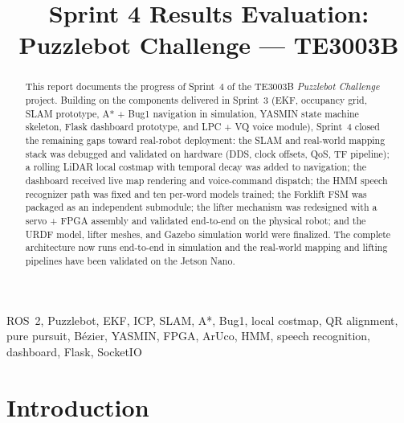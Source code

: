 \documentclass[conference]{IEEEtran}
\begin{document}
\title{Sprint 4 Results Evaluation:\\
Puzzlebot Challenge --- TE3003B}

\author{
}
\maketitle

\begin{abstract}
This report documents the progress of Sprint~4 of the TE3003B
\textit{Puzzlebot Challenge} project. Building on the components delivered
in Sprint~3 (EKF, occupancy grid, SLAM prototype, A* + Bug1 navigation in
simulation, YASMIN state machine skeleton, Flask dashboard prototype, and
LPC + VQ voice module), Sprint~4 closed the remaining gaps toward real-robot
deployment: the SLAM and real-world mapping stack was debugged and validated
on hardware (DDS, clock offsets, QoS, TF pipeline); a rolling LiDAR local
costmap with temporal decay was added to navigation; the dashboard received
live map rendering and voice-command dispatch; the HMM speech recognizer path
was fixed and ten per-word models trained; the Forklift FSM was packaged as
an independent submodule; the lifter mechanism was redesigned with a
servo + FPGA assembly and validated end-to-end on the physical robot; and the
URDF model, lifter meshes, and Gazebo simulation world were finalized.
The complete architecture now runs end-to-end in simulation and the
real-world mapping and lifting pipelines have been validated on the Jetson Nano.
\end{abstract}

\begin{IEEEkeywords}
ROS~2, Puzzlebot, EKF, ICP, SLAM, A*, Bug1, local costmap, QR alignment,
pure pursuit, Bézier, YASMIN, FPGA, ArUco, HMM, speech recognition,
dashboard, Flask, SocketIO
\end{IEEEkeywords}

\section{Introduction}
\end{document}
